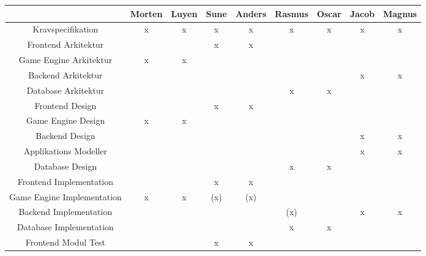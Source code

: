 \begin{center}
  \begin{longtable}{|c|c|c|c|c|c|c|c|c|}
    \hline
                                & Morten & Luyen & Sune  & Anders & Rasmus & Oscar & Jacob & Magnus \\ \hline
    Kravspecifikation           & x      & x     & x     & x      & x      & x     & x     & x      \\ \hline
    Frontend Arkitektur         &        &       & x     & x      &        &       &       &        \\ \hline
    Game Engine Arkitektur      & x      & x     &       &        &        &       &       &        \\ \hline
    Backend Arkitektur          &        &       &       &        &        &       & x     & x      \\ \hline
    Database Arkitektur         &        &       &       &        & x      & x     &       &        \\ \hline
    Frontend Design             &        &       & x     & x      &        &       &       &        \\ \hline
    Game Engine Design          & x      & x     &       &        &        &       &       &        \\ \hline
    Backend Design              &        &       &       &        &        &       & x     & x      \\ \hline
    Applikations Modeller       &        &       &       &        &        &       & x     & x      \\ \hline
    Database Design             &        &       &       &        & x      & x     &       &        \\ \hline
    Frontend Implementation     &        &       & x     & x      &        &       &       &        \\ \hline
    Game Engine Implementation  & x      & x     & (x)   & (x)    &        &       &       &        \\ \hline
    Backend Implementation      &        &       &       &        & (x)    &       & x     & x      \\ \hline
    Database Implementation     &        &       &       &        & x      & x     &       &        \\ \hline
    Frontend Modul Test         &        &       & x     & x      &        &       &       &        \\ \hline

\end{longtable}
\end{center}
